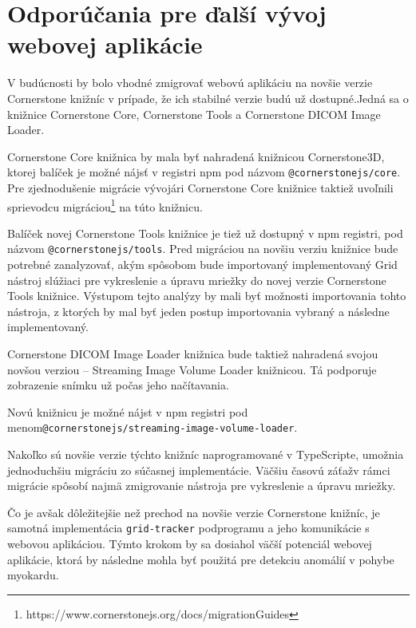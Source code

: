 \chapter {Odporúčania pre ďalší vývoj webovej aplikácie}
V budúcnosti by bolo vhodné zmigrovať webovú aplikáciu na novšie verzie Cornerstone knižníc v prípade, že ich stabilné verzie budú už dostupné.\newline Jedná sa o knižnice Cornerstone Core, Cornerstone Tools a Cornerstone DICOM Image Loader.

Cornerstone Core knižnica by mala byť nahradená knižnicou Cornerstone3D, ktorej balíček je možné nájsť v registri npm pod názvom \newline \texttt{@cornerstonejs/core}. Pre zjednodušenie migrácie vývojári Cornerstone Core knižnice taktiež uvoľnili sprievodcu migráciou\footnote{https://www.cornerstonejs.org/docs/migrationGuides} na túto knižnicu.

Balíček novej Cornerstone Tools knižnice je tiež už dostupný v npm registri, pod názvom \texttt{@cornerstonejs/tools}. Pred migráciou na novšiu verziu knižnice bude potrebné zanalyzovať, akým spôsobom bude importovaný implementovaný Grid nástroj slúžiaci pre vykreslenie a úpravu mriežky do novej verzie Cornerstone Tools knižnice. Výstupom tejto analýzy by mali byť možnosti importovania tohto nástroja, z ktorých by mal byť jeden postup importovania vybraný a následne implementovaný.

\clearpage

Cornerstone DICOM Image Loader knižnica bude taktiež nahradená svojou novšou verziou -- Streaming Image Volume Loader knižnicou. Tá podporuje zobrazenie snímku už počas jeho načítavania.

Novú knižnicu je možné nájst v npm registri pod menom\newline \texttt{@cornerstonejs/streaming-image-volume-loader}.

Nakoľko sú novšie verzie týchto knižníc naprogramované v TypeScripte, umožnia jednoduchšiu migráciu zo súčasnej implementácie. Väčšiu časovú záťaž\newline v rámci migrácie spôsobí najmä zmigrovanie nástroja pre vykreslenie a úpravu mriežky.

Čo je avšak dôležitejšie než prechod na novšie verzie Cornerstone knižníc, je samotná implementácia \texttt{grid-tracker} podprogramu a jeho komunikácie s webovou aplikáciou. Týmto krokom by sa dosiahol väčší potenciál webovej aplikácie, ktorá by následne mohla byť použitá pre detekciu anomálií v pohybe myokardu.
